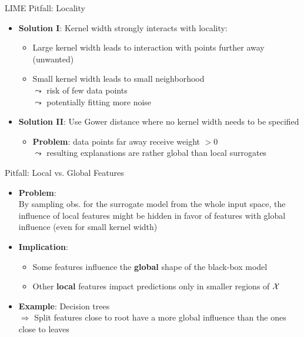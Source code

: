 \documentclass[11pt,compress,t,notes=noshow, aspectratio=169, xcolor=table]{beamer}
\begin{document}
\begin{frame}[c]{LIME Pitfall: Locality }
    \begin{itemize} 
         \item \textbf{Solution I}: Kernel width strongly interacts with locality:
         \begin{itemize}
             \item Large kernel width leads to interaction with points further away (unwanted)
             \item Small kernel width leads to small neighborhood\\
             $\leadsto$ risk of few data points\\
             $\leadsto$ potentially fitting more noise
         \end{itemize}
         \pause
    	\item \textbf{Solution II}: Use Gower distance where no kernel width needs to be specified 
    	\begin{itemize}
    	    \item \textbf{Problem}: data points far away receive weight $ > 0$\\
    	    $\leadsto$ resulting explanations are rather global than local surrogates   
    	\end{itemize}
    \end{itemize}
\vspace{0.3cm}

\end{frame}

\begin{frame}[c]{Pitfall: Local vs. Global Features }

\begin{itemize}%
	\item<1-> \textbf{Problem}: \\
	By sampling obs. for the surrogate model from the whole input space, the influence of local features might be hidden in favor of features with global influence (even for small kernel width)
	\item<2-> \textbf{Implication}: 
	\begin{itemize}
	    \item Some features influence the \textbf{global} shape of the black-box model
	    \item Other \textbf{local} features impact predictions only in smaller regions of $\Xspace$ %
	\end{itemize}
	\item<3-> \textbf{Example}: Decision trees\\
	$\Rightarrow$ Split features close to root have a more global influence than the ones close to leaves
\end{itemize}

\end{frame}
\end{document}
